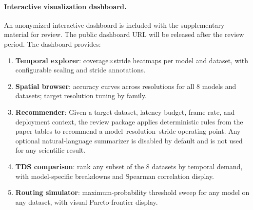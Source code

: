 \documentclass[runningheads]{llncs}
\newcommand{\rev}[1]{\textcolor{revblue}{#1}}
\newcommand{\revdel}[1]{}
\begin{document}
\paragraph{Interactive visualization dashboard.}
An anonymized interactive dashboard is included with the supplementary material for review. The public dashboard URL will be released after the review period. The dashboard provides:
\begin{enumerate}[leftmargin=*,topsep=2pt,itemsep=1pt]
\item \textbf{Temporal explorer}: coverage$\times$stride heatmaps per model and
  dataset, with configurable scaling and stride annotations.
\item \textbf{Spatial browser}: accuracy curves across resolutions for all
  8 models and datasets; target resolution tuning by family.
\item \textbf{Recommender}: \revdel{the system combines structured analysis with LLM synthesis through an external provider.} \rev{Given a target dataset, latency budget, frame rate, and deployment context, the review package applies deterministic rules from the paper tables to recommend a model--resolution--stride operating point. Any optional natural-language summarizer is disabled by default and is not used for any scientific result.}
\item \textbf{TDS comparison}: rank any subset of the 8 datasets by temporal demand,
  with model-specific breakdowns and Spearman correlation display.
\item \textbf{Routing simulator}: \rev{maximum-probability threshold sweep}\revdel{entropy threshold sweep} for any model on any dataset,
  with visual Pareto-frontier display.
\end{enumerate}
\end{document}
